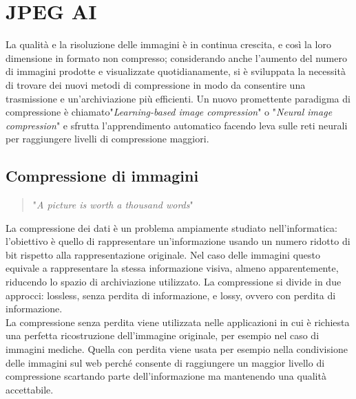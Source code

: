 \section{JPEG AI} \label{sec:jpegai}
La qualità e la risoluzione delle immagini  è in continua crescita, e così la loro dimensione in formato non compresso; considerando anche l'aumento del numero di immagini prodotte e visualizzate quotidianamente, si è sviluppata la necessità di trovare dei nuovi metodi di compressione in modo da consentire una trasmissione e un'archiviazione più efficienti.
Un nuovo promettente paradigma di compressione è chiamato"\textit{Learning-based image compression}" o "\textit{Neural image compression}" e sfrutta l'apprendimento automatico  facendo leva sulle reti neurali per raggiungere livelli di compressione maggiori.
\subsection{Compressione di immagini}
\begin{quote} 
    "\textit{A picture is worth a thousand words}"
\end{quote}
La compressione dei dati è un problema ampiamente studiato nell'informatica: l'obiettivo è quello di rappresentare un'informazione usando un numero ridotto di bit rispetto alla rappresentazione originale. Nel caso delle immagini questo equivale a rappresentare la stessa informazione visiva, almeno apparentemente, riducendo lo spazio di archiviazione utilizzato. La compressione si divide in due approcci: lossless,  senza perdita di informazione, e lossy, ovvero con perdita di informazione.\\
La compressione senza perdita viene utilizzata nelle applicazioni in cui è richiesta una perfetta ricostruzione dell'immagine originale, per esempio nel caso di immagini mediche. Quella con perdita viene usata per esempio nella condivisione delle immagini sul web perché consente di raggiungere un maggior livello di compressione scartando parte dell'informazione ma mantenendo una qualità accettabile.
